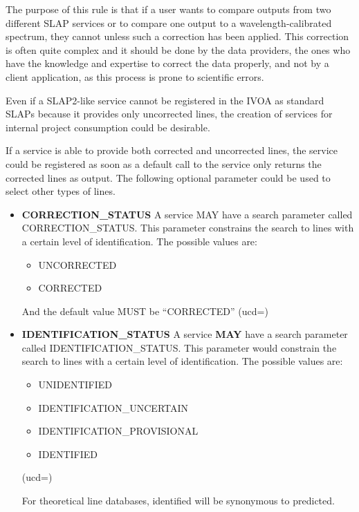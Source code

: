 \documentclass[11pt,a4paper]{ivoa}
\begin{document}
The purpose of this rule is that if a user wants to compare
outputs from two different SLAP
services or to compare one output to a wavelength-calibrated spectrum,
they cannot unless such a correction has been applied. This
correction is often quite complex and it should be done by the data
providers, the ones who have the knowledge and expertise to correct the
data properly, and not by a client application, as this process is prone
to scientific errors.

Even if a SLAP2-like service cannot be registered in the IVOA as standard
SLAPs because it provides only uncorrected lines, the creation of
services for internal project consumption could be desirable.

If a service is able to provide both corrected and uncorrected lines,
the service could be registered as soon as a default call to the service
only returns the corrected lines as output. The following optional
parameter could be used to select other types of lines.

\begin{itemize}
\item {\bfseries CORRECTION\_STATUS}
A service MAY have a search parameter called CORRECTION\_STATUS.
This parameter constrains the search to lines with a certain level
of identification. The possible values are:

\begin{itemize}
\item UNCORRECTED
\item CORRECTED
\end{itemize}

And the default value MUST be ``CORRECTED''
(ucd=)

\item {\bfseries IDENTIFICATION\_STATUS}
A service \textbf{MAY} have a search parameter called
IDENTIFICATION\_STATUS. This parameter would constrain the search to
lines with a certain level of identification. The
possible values are:

\begin{itemize}
\item UNIDENTIFIED
\item IDENTIFICATION\_UNCERTAIN
\item IDENTIFICATION\_PROVISIONAL
\item IDENTIFIED
\end{itemize}

(ucd=)

For theoretical line databases, identified will be synonymous to predicted.
\end{itemize}
\end{document}
